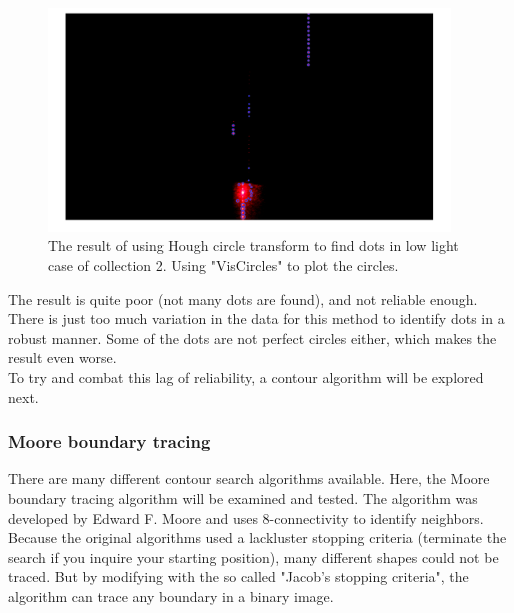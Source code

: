 \begin{figure}[H]
    \centering
    \includegraphics[width=0.95\textwidth]{figures/ImageAnalysis/HoughCircle/HoughCircles_lowlight2.png}
    \caption{The result of using Hough circle transform to find dots in low light case of collection 2. Using "VisCircles" to plot the circles.}
    \label{fig:houghcirclelowlight2}
\end{figure}
\FloatBarrier
The result is quite poor (not many dots are found), and not reliable enough. There is just too much variation in the data for this method to identify dots in a robust manner. Some of the dots are not perfect circles either, which makes the result even worse.\\

To try and combat this lag of reliability, a contour algorithm will be explored next. 



\subsubsection{Moore boundary tracing}
There are many different contour search algorithms available. Here, the Moore boundary tracing algorithm will be examined and tested. The algorithm was developed by Edward F. Moore and uses 8-connectivity to identify neighbors. Because the original algorithms used a lackluster stopping criteria (terminate the search if you inquire your starting position), many different shapes could not be traced. But by modifying with the so called "Jacob's stopping criteria", the algorithm can trace any boundary in a binary image. \\


